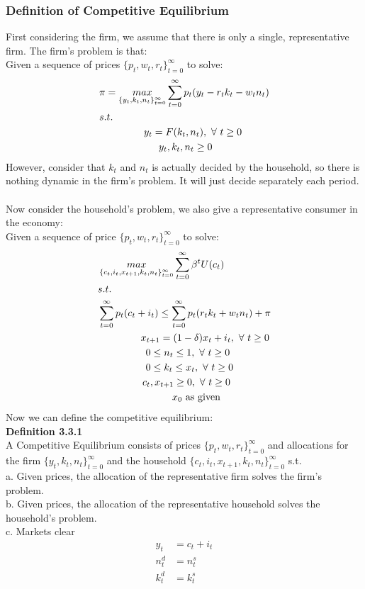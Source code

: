 \documentclass{article}
\begin{document}
\subsubsection{Definition of Competitive Equilibrium}
First considering the firm, we assume that there is only a single, representative firm. The firm's problem is that:\\
\indent Given a sequence of prices $\{p_t, w_t, r_t\}^\infty_{t=0}$ to solve:
\begin{align*}
	&\pi = \mathop{max}\limits_{\{y_t, k_t, n_t\}^\infty_{t=0}} \sum\limits^\infty_{t=0} p_t(y_t - r_t k_t - w_t n_t)\\
	&s.t.\\
	&\indent\indent\indent y_t = F(k_t, n_t),\ \forall\ t \geq 0\\
	&\indent\indent\indent\indent y_t, k_t, n_t \geq 0
\end{align*} 
However, consider that $k_t$ and $n_t$ is actually decided by the household, so there is nothing dynamic in the firm's problem. It will just decide separately each period.\\\\
Now consider the household's problem, we also give a representative consumer in the economy:\\
\indent Given a sequence of price $\{p_t, w_t, r_t\}^\infty_{t=0}$ to solve:
\begin{align*}
	&\mathop{max}\limits_{\{c_t, i_t, x_{t+1}, k_t, n_t\}^\infty_{t=0}} \sum\limits^\infty_{t=0} \beta^t U(c_t)\\
	&s.t.\\
	& \sum\limits^\infty_{t=0} p_t(c_t + i_t) \leq \sum\limits^\infty_{t=0} p_t(r_t k_t + w_t n_t) + \pi\\
	&\indent\indent\ \ \ \ x_{t+1} = (1 - \delta)x_t + i_t,\ \forall\ t \geq 0\\
	&\indent\indent\indent\ 0 \leq n_t \leq 1,\ \forall\ t \geq 0\\
	&\indent\indent\indent\ 0 \leq k_t \leq x_t,\ \forall\ t \geq 0\\
	&\indent\indent\indent c_t, x_{t+1} \geq 0,\ \forall\ t \geq 0\\
	&\indent\indent\indent\indent\indent x_0\ \text{as given}
\end{align*}
Now we can define the competitive equilibrium:\\
\textbf{Definition 3.3.1}\\
A Competitive Equilibrium consists of prices $\{p_t, w_t, r_t\}^\infty_{t=0}$ and allocations for the firm $\{y_t, k_t, n_t\}^\infty_{t=0}$ and the household $\{c_t, i_t, x_{t+1}, k_t, n_t\}^\infty_{t=0}$ s.t.\\
\indent a. Given prices, the allocation of the representative firm solves the firm's problem.\\
\indent b. Given prices, the allocation of the representative household solves the household's problem.\\
\indent c. Markets clear
\begin{align*}
	y_t &= c_t + i_t\\
	n^d_t &= n^s_t\\
	k^d_t &= k^s_t
\end{align*}
\end{document}
